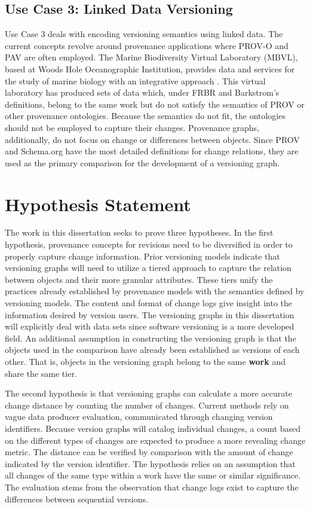 \subsection{Use Case 3: Linked Data Versioning}

Use Case 3 deals with encoding versioning semantics using linked data.
The current concepts revolve around provenance applications where PROV-O and PAV are often employed.
The Marine Biodiversity Virtual Laboratory (MBVL), based at Woods Hole Oceanographic Institution, provides data and services for the study of marine biology with an integrative approach \cite{mbvl}.
This virtual laboratory has produced sets of data which, under FRBR and Barkstrom's definitions, belong to the same work but do not satisfy the semantics of PROV or other provenance ontologies.
Because the semantics do not fit, the ontologies should not be employed to capture their changes.
Provenance graphs, additionally, do not focus on change or differences between objects.
Since PROV and Schema.org have the most detailed definitions for change relations, they are used as the primary comparison for the development of a versioning graph.

\section{Hypothesis Statement}

The work in this dissertation seeks to prove three hypotheses.
In the first hypothesis, provenance concepts for revisions need to be diversified in order to properly capture change information.
Prior versioning models indicate that versioning graphs will need to utilize a tiered approach to capture the relation between objects and their more granular attributes.
These tiers unify the practices already established by provenance models with the semantics defined by versioning models.
The content and format of change logs give insight into the information desired by version users.
The versioning graphs in this dissertation will explicitly deal with data sets since software versioning is a more developed field.
An additional assumption in constructing the versioning graph is that the objects used in the comparison have already been established as versions of each other.
That is, objects in the versioning graph belong to the same \textbf{work} and share the same tier.

The second hypothesis is that versioning graphs can calculate a more accurate change distance by counting the number of changes.
Current methods rely on vague data producer evaluation, communicated through changing version identifiers.
Because version graphs will catalog individual changes, a count based on the different types of changes are expected to produce a more revealing change metric.
The distance can be verified by comparison with the amount of change indicated by the version identifier.
The hypothesis relies on an assumption that all changes of the same type within a work have the same or similar significance.
The evaluation stems from the observation that change logs exist to capture the differences between sequential versions.

